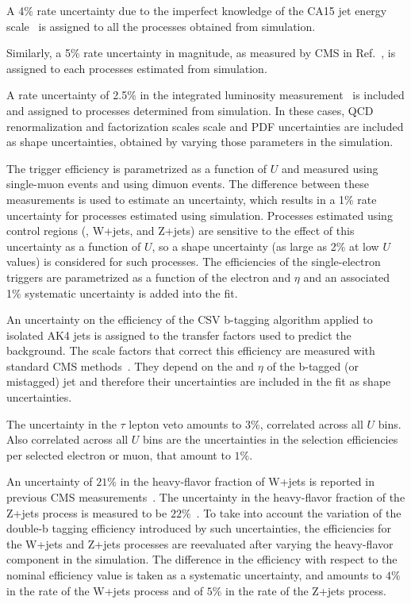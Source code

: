 A 4\% rate uncertainty due to the imperfect knowledge of the CA15 jet energy scale~\cite{jec} is assigned to all the processes obtained from simulation.

Similarly, a 5\% rate uncertainty in \ptmiss magnitude, as measured by CMS in Ref.~\cite{Khachatryan:2014gga}, is assigned to each processes estimated from simulation.

A rate uncertainty of 2.5\% in the integrated luminosity measurement~\cite{CMS-PAS-LUM-17-001} is included and assigned to processes determined from simulation. In these cases, QCD renormalization and factorization scales scale and PDF uncertainties are included as shape uncertainties, obtained by varying those parameters in the simulation.%

The \MET trigger efficiency is parametrized as a function of $U$ and measured using single-muon events and using dimuon events. 
The difference between these measurements is used to estimate an uncertainty, which results in a 1\% rate uncertainty for processes estimated using simulation.
Processes estimated using control regions (\ttbar, W+jets, and Z+jets) are sensitive to the effect of this uncertainty as a function of $U$, so a shape uncertainty (as large as 2\% at low $U$ values) is considered for such processes.
The efficiencies of the single-electron triggers are parametrized as a function of the electron \pt and $\eta$ and an associated 1\% systematic uncertainty is added into the fit.

An uncertainty on the efficiency of the CSV b-tagging algorithm applied to isolated AK4 jets is assigned to the transfer factors used to predict the \ttbar background. The scale factors that correct this efficiency are measured with standard CMS methods~\cite{Sirunyan:2017ezt}. They depend on the \pt and $\eta$ of the b-tagged (or mistagged) jet and therefore their uncertainties are included in the fit as shape uncertainties.

The uncertainty in the $\tau$ lepton veto amounts to $3\%$, correlated across all $U$ bins. Also correlated across all $U$ bins are the uncertainties in the selection efficiencies per selected electron or muon, that amount to $1\%$.

An uncertainty of $21\%$ in the heavy-flavor fraction of W+jets is reported in previous CMS measurements~\cite{Khachatryan:2014uva,Chatrchyan:2013uza}. The uncertainty in the heavy-flavor fraction of the Z+jets process is measured to be $22\%$~\cite{Khachatryan:2014zya,Chatrchyan:2014dha}. To take into account the variation of the double-b tagging efficiency introduced by such uncertainties, the efficiencies for the W+jets and Z+jets processes are reevaluated after varying the heavy-flavor component in the simulation. The difference in the efficiency with respect to the nominal efficiency value is taken as a systematic uncertainty, and amounts to $4\%$ in the rate of the W+jets process and of $5\%$ in the rate of the Z+jets process. 

